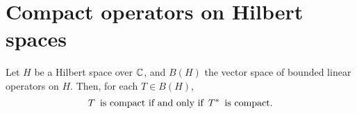 

\section{Compact operators on Hilbert spaces}
\setcounter{theorem}{0}
\setcounter{equation}{0}


\renewcommand{\theenumi}{\roman{enumi}}
\renewcommand{\labelenumi}{\textnormal{(\theenumi)}$\;\;$}


\begin{theorem}\mbox{}
\vskip 0.1cm
\noindent
Let $H$ be a Hilbert space over $\mathbb{C}$, and $B(H)$ the vector space of bounded linear operators on $H$.
Then, for each $T \in B(H)$,
\begin{equation*}
\textnormal{$T$\, is compact if and only if \,$T^{*}$\, is compact.}
\end{equation*}
\end{theorem}


